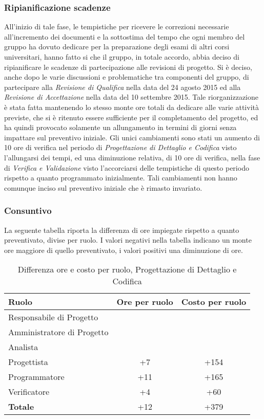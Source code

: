 \subsubsection{Ripianificazione scadenze}
\label{scadenze}
All'inizio di tale fase, le tempistiche per ricevere le correzioni necessarie all'incremento dei documenti e la sottostima del tempo che ogni membro del gruppo ha dovuto dedicare per la preparazione degli esami di altri corsi universitari, hanno fatto si che il gruppo, in totale accordo, abbia deciso di ripianificare le scadenze di partecipazione alle revisioni di progetto. Si è deciso, anche dopo le varie discussioni e problematiche tra componenti del gruppo, di partecipare alla \textit{Revisione di Qualifica} nella data del 24 agosto 2015 ed alla \textit{Revisione di Accettazione} nella data del 10 settembre 2015. Tale riorganizzazione è stata fatta mantenendo lo stesso monte ore totali da dedicare alle varie attività previste, che si è ritenuto essere sufficiente per il completamento del progetto, ed ha quindi provocato solamente un allungamento in termini di giorni senza impattare sul preventivo iniziale. Gli unici cambiamenti sono stati un aumento di 10 ore di verifica nel periodo di \textit{Progettazione di Dettaglio e Codifica} 
visto l'allungarsi dei tempi, ed una diminuzione relativa, di 10 ore di verifica, nella fase di \textit{Verifica e Validazione} visto l'accorciarsi delle tempistiche di questo periodo rispetto a quanto programmato inizialmente. Tali cambiamenti non hanno comunque inciso sul preventivo iniziale che è rimasto invariato.

\subsubsection{Consuntivo}
La seguente tabella riporta la differenza di ore impiegate rispetto a quanto preventivato, divise per ruolo. I valori negativi nella tabella indicano un monte ore maggiore di quello preventivato, i valori positivi una diminuzione di ore.

\begin{table}[h]
	\centering
	\begin{tabular}{|l|c|c|}
		\toprule
		\textbf{Ruolo} & \textbf{Ore per ruolo} & \textbf{Costo per ruolo} \\
		
		\midrule
		Responsabile di Progetto & & \\
		Amministratore di Progetto & & \\ 
		Analista & & \\
		Progettista & +7 & +154 \\
		Programmatore & +11 & +165 \\
		Verificatore & +4 & +60 \\
		\midrule
		\textbf{Totale} & +12 & +379 \\
		
		\bottomrule
	\end{tabular}
	\caption{Differenza ore e costo per ruolo, Progettazione di Dettaglio e Codifica}
	\label{tab6}
\end{table} 

